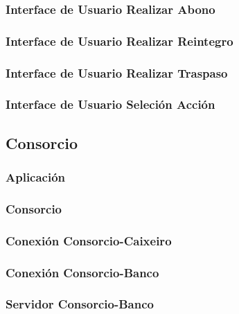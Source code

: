 \documentclass[a4paper,titlepage]{article}
\begin{document}
\subsubsection{Interface de Usuario Realizar Abono}

\subsubsection{Interface de Usuario Realizar Reintegro}

\subsubsection{Interface de Usuario Realizar Traspaso}

\subsubsection{Interface de Usuario Seleción Acción}



\subsection{Consorcio}
\subsubsection{Aplicación}

\subsubsection{Consorcio}

\subsubsection{Conexión Consorcio-Caixeiro}

\subsubsection{Conexión Consorcio-Banco}

\subsubsection{Servidor Consorcio-Banco}

\end{document}
